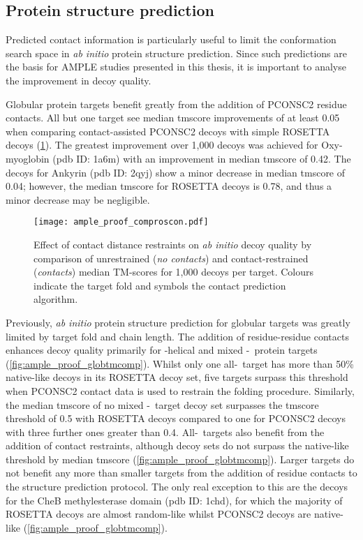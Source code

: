 \subsection{Protein structure prediction}
Predicted contact information is particularly useful to limit the conformation search space in \textit{ab initio} protein structure prediction. Since such predictions are the basis for AMPLE studies presented in this thesis, it is important to analyse the improvement in decoy quality.

Globular protein targets benefit greatly from the addition of PCONSC2 residue contacts. All but one target see median \gls{tmscore} improvements of at least 0.05 when comparing contact-assisted PCONSC2 decoys with simple ROSETTA decoys (\cref{fig:ample_proof_comproscon}). The greatest improvement over 1,000 decoys was achieved for Oxy-myoglobin (\gls{pdb} ID: 1a6m) with an improvement in median \gls{tmscore} of 0.42.  The decoys for Ankyrin (\gls{pdb} ID: 2qyj) show a minor decrease in median \gls{tmscore} of 0.04; however, the median \gls{tmscore} for ROSETTA decoys is 0.78, and thus a minor decrease may be negligible. 

\begin{figure}[H]
    \centering
    \texttt{[image: ample\_proof\_comproscon.pdf]}
    \caption[Effect of contact distance restraints on \textit{ab initio} decoy quality]{Effect of contact distance restraints on \textit{ab initio} decoy quality by comparison of unrestrained (\textit{no contacts}) and contact-restrained (\textit{contacts}) median TM-scores for 1,000 decoys per target. Colours indicate the target fold and symbols the contact prediction algorithm.}
    \label{fig:ample_proof_comproscon}
\end{figure}

Previously, \textit{ab initio} protein structure prediction for globular targets was greatly limited by target fold and chain length. The addition of residue-residue contacts enhances decoy quality primarily for \textalpha-helical and mixed \textalpha-\textbeta\ protein targets (\cref{fig:ample_proof_globtmcomp}). Whilst only one all-\textalpha\ target has more than 50\% native-like decoys in its ROSETTA decoy set, five targets surpass this threshold when PCONSC2 contact data is used to restrain the folding procedure. Similarly, the median \gls{tmscore} of no mixed \textalpha-\textbeta\ target decoy set surpasses the \gls{tmscore} threshold of 0.5 with ROSETTA decoys compared to one for PCONSC2 decoys with three further ones greater than 0.4. All-\textbeta\ targets also benefit from the addition of contact restraints, although decoy sets do not surpass the native-like threshold by median \gls{tmscore} (\cref{fig:ample_proof_globtmcomp}). Larger targets do not benefit any more than smaller targets from the addition of residue contacts to the structure prediction protocol. The only real exception to this are the decoys for the CheB methylesterase domain (\gls{pdb} ID: 1chd), for which the majority of ROSETTA decoys are almost random-like whilst PCONSC2 decoys are native-like (\cref{fig:ample_proof_globtmcomp}).

